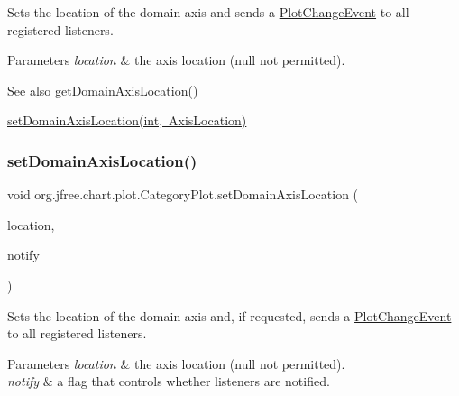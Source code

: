 Sets the location of the domain axis and sends a \mbox{\hyperlink{}{Plot\+Change\+Event}} to all registered listeners.


\begin{DoxyParams}{Parameters}
{\em location} & the axis location ({\ttfamily null} not permitted).\\
\hline
\end{DoxyParams}
\begin{DoxySeeAlso}{See also}
\mbox{\hyperlink{classorg_1_1jfree_1_1chart_1_1plot_1_1_category_plot_aaf592d8e5e782d115441eaea76f88274}{get\+Domain\+Axis\+Location()}} 

\mbox{\hyperlink{classorg_1_1jfree_1_1chart_1_1plot_1_1_category_plot_a63be5f2040ea560e408c89c2e2dd7b3b}{set\+Domain\+Axis\+Location(int, Axis\+Location)}} 
\end{DoxySeeAlso}
\mbox{\label{classorg_1_1jfree_1_1chart_1_1plot_1_1_category_plot_a41de193ebdcfd2a1ea3622f2aac896d5}} 
\subsubsection{\texorpdfstring{set\+Domain\+Axis\+Location()}{setDomainAxisLocation()}\hspace{0.1cm}{\footnotesize\ttfamily [2/4]}}
{\footnotesize\ttfamily void org.\+jfree.\+chart.\+plot.\+Category\+Plot.\+set\+Domain\+Axis\+Location (\begin{DoxyParamCaption}\item[{\mbox{\hyperlink{classorg_1_1jfree_1_1chart_1_1axis_1_1_axis_location}{Axis\+Location}}}]{location,  }\item[{boolean}]{notify }\end{DoxyParamCaption})}

Sets the location of the domain axis and, if requested, sends a \mbox{\hyperlink{}{Plot\+Change\+Event}} to all registered listeners.


\begin{DoxyParams}{Parameters}
{\em location} & the axis location ({\ttfamily null} not permitted). \\
\hline
{\em notify} & a flag that controls whether listeners are notified. \\
\hline
\end{DoxyParams}
\mbox{\label{classorg_1_1jfree_1_1chart_1_1plot_1_1_category_plot_a63be5f2040ea560e408c89c2e2dd7b3b}} 
